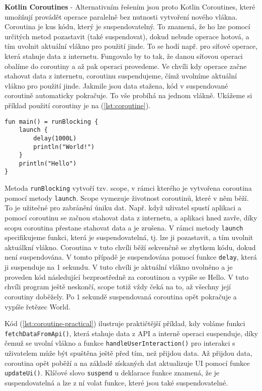 \vspace{10px}

\noindent\textbf{Kotlin Coroutines} - Alternativním řešením jsou proto Kotlin Coroutines, které umožňují provádět operace paralelně bez nutnosti vytvoření nového vlákna. Coroutina je kus kódu, který je suspendovatelný. To znamená, že ho lze pomocí určitých metod pozastavit (také suspendovat), dokud nebude operace hotová, a tím uvolnit aktuální vlákno pro použití jinde. To se hodí např. pro síťové operace, která stahuje data z internetu. Fungovalo by to tak, že danou síťovou operaci obalíme do coroutiny a až pak operaci provedeme. Ve chvíli kdy operace začne stahovat data z internetu, coroutinu suspendujeme, čímž uvolníme aktuální vlákno pro použití jinde. Jakmile jsou data stažena, kód v suspendované coroutině automaticky pokračuje. To vše probíhá na jednom vlákně. Ukážeme si příklad použití coroutiny je na (\ref{lst:coroutine}).

\begin{lstlisting}[caption={Příklad použití coroutiny}, label={lst:coroutine}, tabsize=2]
fun main() = runBlocking {
	launch {
		delay(1000L)
		println("World!")
	}
	println("Hello")
}
\end{lstlisting}

\noindent Metoda \lstinline|runBlocking| vytvoří tzv. scope, v rámci kterého je vytvořena coroutina pomocí metody \lstinline|launch|. Scope vymezuje životnost coroutinů, které v něm běží. To je užitečné pro zabránění úniku dat. Např. když uživatel spustí aplikaci a pomocí coroutinu se začnou stahovat data z internetu, a aplikaci hned zavře, díky scopu coroutina přestane stahovat data a je zrušena. V rámci metody \lstinline|launch| specifikujeme funkci, která je suspendovatelná, tj. lze ji pozastavit, a tím uvolnit aktuálkní vlákno. Coroutina v tuto chvíli běží sekvenčně se zbytkem kódu, dokud není suspendována. V tomto případě je suspendována pomocí funkce \lstinline|delay|, která ji suspenduje na 1 sekundu. V tuto chvíli je aktuální vlákno uvolněno a je proveden kód následující bezprostředně za coroutinou a vypíše se Hello. V tuto chvíli program ještě neskončí, scope totiž vždy čeká na to, až všechny její coroutiny doběžely. Po 1 sekundě suspendovaná coroutina opět pokračuje a vypíše řetězec World.

Kód (\ref{lst:coroutine-practical}) ilustruje praktičtější příklad, kdy voláme funkci \lstinline|fetchDataFromApi()|, která stahuje data z API a interně operaci suspenduje, díky čemuž se uvolní vlákno a funkce \lstinline|handleUserInteraction()| pro interakci s uživatelem může být spuštěna ještě před tím, než přijdou data. Až přijdou data, coroutina opět poběží a na základě získaných dat aktualizuje UI pomocí funkce \lstinline|updateUi()|. Klíčové slovo \lstinline|suspend| u deklarace funkce znamená, že je suspendovatelná a lze z ní volat funkce, které jsou také suspendovatelné.

